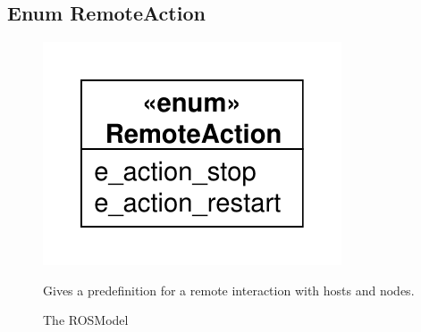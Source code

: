 
\subsection{Enum RemoteAction}
\begin{figure}[htbp]
	\begin{minipage}[t]{7cm}
		\vspace{0pt}
		\centering
		\includegraphics[scale=0.6]{./diagram_pictures/RemoteAction.pdf}
		\caption{The ROSModel}
	\end{minipage}
	\hfill
	\begin{minipage}[t]{8cm}
		\vspace{10pt}
		Gives a predefinition for a remote interaction with hosts and nodes.
	\end{minipage}
\end{figure}  
